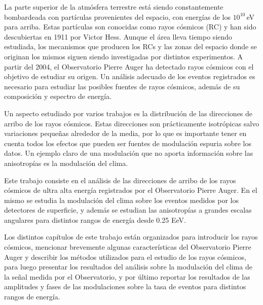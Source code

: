 



La parte superior de la atmósfera terrestre está siendo constantemente bombardeada con partículas provenientes del espacio, con energías de los $10^{10}\,$eV para arriba. Estas partículas son conocidas como rayos cósmicos (RC) y han sido descubiertas en 1911 por Victor Hess. Aunque el área lleva tiempo siendo estudiada, los mecanismos que producen los RCs y las zonas del espacio donde se originan los mismos siguen siendo investigadas por distintos experimentos.  A partir del 2004, el Observatorio Pierre Auger ha detectado rayos cósmicos con el objetivo de estudiar su origen. Un análisis adecuado de los eventos registrados es necesario para estudiar las posibles fuentes de rayos cósmicos, además de su composición y espectro de energía.

Un aspecto estudiado por varios trabajos \cite{collaboration2013pierre} \cite{data} es la distribución de las direcciones de arribo de los rayos cósmicos. Estas direcciones son prácticamente isotrópicas salvo variaciones pequeñas alrededor de la media, por lo que es importante tener en cuenta todos los efectos que pueden ser fuentes de modulación espuria sobre los datos. Un ejemplo claro de una modulación que no aporta información sobre las anisotropías es la modulación del clima.

Este trabajo consiste en el análisis de las direcciones de arribo de los rayos cósmicos de ultra alta energía registrados por el Observatorio Pierre Auger. En el mismo se estudia la modulación del clima sobre los eventos medidos por los detectores de superficie, y además se estudian las anisotropías a grandes escalas angulares para distintos rangos de energía desde 0.25 EeV.  

Los distintos capítulos de este trabajo están organizados para introducir los rayos cósmicos, mencionar brevemente algunas características del Observatorio Pierre Auger y describir los métodos utilizados para el estudio de los rayos cósmicos, para luego presentar los resultados del análisis sobre la modulación del clima de la señal medida por el Observatorio, y por último reportar los resultados de las amplitudes y fases de las modulaciones sobre la tasa de eventos para distintos rangos de energía.

